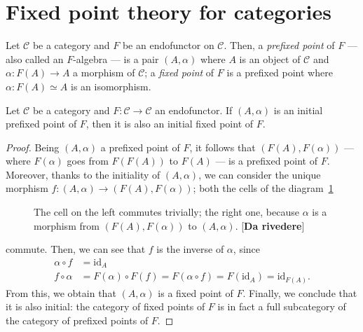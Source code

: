 \section{Fixed point theory for categories}

\begin{dfn}
  Let \(\mathcal{C}\) be a category and \(F\) be an endofunctor on \(\mathcal{C}\).
  Then, a \emph{prefixed point} of \(F\) --- also called an \(F\)-algebra --- is a pair \((A,\alpha)\) where \(A\) is an object of \(\mathcal{C}\) and \(\alpha \colon F(A) \to A\) a morphism of \(\mathcal{C}\); a \emph{fixed point} of \(F\) is a prefixed point where \(\alpha \colon F(A) \simeq A\) is an isomorphism.
\end{dfn}

\begin{lem}
  Let \(\mathcal{C}\) be a category and \(F \colon \mathcal{C} \to \mathcal{C}\) an endofunctor.
  If \((A,\alpha)\) is an initial prefixed point of \(F\), then it is also an initial fixed point of \(F\).
\end{lem}
\begin{proof}
  Being \((A,\alpha)\) a prefixed point of \(F\), it follows that \((F(A),F(\alpha))\) --- where \(F(\alpha)\) goes from \(F(F(A))\) to \(F(A)\) --- is a prefixed point of \(F\).
  Moreover, thanks to the initiality of \((A,\alpha)\), we can consider the unique morphism \(f \colon (A,\alpha) \to (F(A),F(\alpha))\); both the cells of the diagram~\ref{02:diagram-1}
  \begin{figure}[!ht]
    \begin{center}
    \end{center}
    \caption{The cell on the left commutes trivially; the right one, because \(\alpha\) is a morphism from \((F(A),F(\alpha))\) to \((A,\alpha)\). [\textbf{Da rivedere}]}
    \label{02:diagram-1}
  \end{figure}
  commute.
  Then, we can see that \(f\) is the inverse of \(\alpha\), since
  \begin{align}
    \alpha \circ f &= \mathrm{id}_A \\
    f \circ \alpha &= F(\alpha) \circ F(f) = F (\alpha \circ f) = F(\mathrm{id}_A) = \mathrm{id}_{F(A)}.
  \end{align}
  From this, we obtain that \((A,\alpha)\) is a fixed point of \(F\).
  Finally, we conclude that it is also initial: the category of fixed points of \(F\) is in fact a full subcategory of the category of prefixed points of \(F\).
\end{proof}

